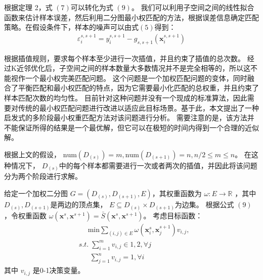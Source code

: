 \documentclass[12pt,a4paper]{article}%
\begin{document}
		根据定理 2，式 $(7)$可以转化为式 $(9)$。 我们可以利用子空间之间的线性拟合函数来估计样本误差，然后利用二分图最小权匹配的方法，根据误差信息确定匹配策略。在假设条件下，样本的噪声可以由式$(5)$得到：
		\begin{align} 
			\varepsilon_i^{s,s+1}=y_i^{s,s+1}-g_{s,s+1}(\boldsymbol{x}_i^{s,s+1})
			\end{align} 
	

		根据插值规则，要求每个样本至少进行一次插值，并且约束了插值的总次数。 经过K近邻优化后，子空间之间的样本数量大多数情况并不是完全相等的，所以这不能视作一个最小权完美匹配问题。
		这个问题是一个加权匹配问题的变体，同时融合了平衡匹配和最小权匹配的特点，因为它需要最小化匹配的总权重，并且约束了样本匹配次数的均匀性。
		目前针对这种问题并没有一个现成的标准算法，因此需要对传统的最小权匹配问题进行改进以适应此目标场景。基于此，本文提出了一种启发式的多阶段最小权重匹配方法对该问题进行分析。
		需要注意的是，该方法并不能保证所得的结果是一个最优解，但它可以在极短的时间内得到一个合理的近似解。

		根据上文的假设， $\text{num}(D_{(s)})=m, \text{num}(D_{(s+1)})=n, n/2\le m\le n$。 在这种情况下， $D_{(s)}$中的每个样本都需要进行一次或者两次的插值，并因此将该问题分为两个阶段进行求解。 
		
		给定一个加权二分图  $G=(D_{(s)},D_{(s+1)},E)$，其权重函数为 $\omega:E\rightarrow\mathbb{R}$ ，其中 $D_{(s)},D_{(s+1)}$是两边的顶点集， $E\subseteq D_{(s)}\times D_{(s+1) }$为边集。 
		根据公式 $(9)$，令权重函数 $\omega(\boldsymbol{x}^{s},\boldsymbol{x}^{s+1})=\bar{S}(\boldsymbol{x}^{s},\boldsymbol{x}^{s+1})$。 考虑目标函数： 
		$$\begin{aligned}
			&\quad\;\text{min}\textstyle\sum\limits_{(i,j)\in{E}}\omega(\boldsymbol{x}^{s}_i,\boldsymbol{x}_j^{s+1})v_{i,j},\\
			&s.t.\; \textstyle\sum\limits_{i=1}^{m}v_{i,j}\in{1,2},\forall j\\  
			&\quad\;\;
			\textstyle\sum\limits_{j=1}^nv_{i,j}=1,\forall i
			\end{aligned}$$
		其中 $v_{i,j}$ 是0-1决策变量。
\end{document}
